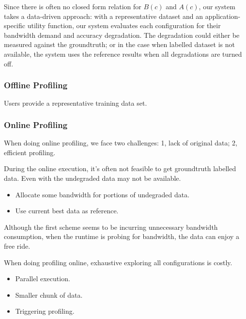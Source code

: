 Since there is often no closed form relation for $B(c)$ and $A(c)$, our system
takes a data-driven approach: with a representative dataset and an
application-specific utility function, our system evaluates each configuration
for their bandwidth demand and accuracy degradation. The degradation could
either be measured against the groundtruth; or in the case when labelled dataset
is not available, the system uses the reference results when all degradations
are turned off.

\subsubsection{Offline Profiling}
\label{sec:offline-profiling}

Users provide a representative training data set. 

\subsubsection{Online Profiling}
\label{sec:online-profiling}

When doing online profiling, we face two challenges: 1, lack of original data;
2, efficient profiling.

 During the online execution,
it's often not feasible to get groundtruth labelled data. Even with the
undegraded data may not be available.

\begin{itemize}[leftmargin=16pt]
\item Allocate some bandwidth for portions of undegraded data.
\item Use current best data as reference.
\end{itemize}

Although the first scheme seems to be incurring unnecessary bandwidth
consumption, when the runtime is probing for bandwidth, the data can enjoy a
free ride.

 When doing profiling online, exhaustive exploring
all configurations is costly.

\begin{itemize}[leftmargin=16pt]
\item Parallel execution.
\item Smaller chunk of data.
\item Triggering profiling.
\end{itemize}




